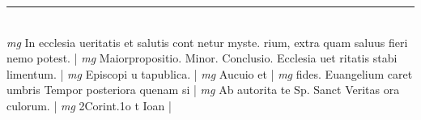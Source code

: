 \documentclass{article}
\begin{document}
\begin{pages}
\vspace{0.5cm}\noindent
\vspace{0.2cm}\rule{1cm}{0.2pt}\\ 
\hspace{0.2cm}\textit{mg}
\footnotesize In ecclesia ueritatis et salutis cont netur myste. rium, extra quam saluus fieri nemo potest. 
\normalsize| 
\hspace{0.2cm}\textit{mg}
\footnotesize Maiorpropositio. Minor. Conclusio. Ecclesia uet ritatis stabi limentum. 
\normalsize| 
\hspace{0.2cm}\textit{mg}
\footnotesize Episcopi u tapublica. 
\normalsize| 
\hspace{0.2cm}\textit{mg}
\footnotesize Aucuio et 
\normalsize| 
\hspace{0.2cm}\textit{mg}
\footnotesize fides. Euangelium caret umbris Tempor posteriora quenam si 
\normalsize| 
\hspace{0.2cm}\textit{mg}
\footnotesize Ab autorita te Sp. Sanct Veritas ora culorum. 
\normalsize| 
\hspace{0.2cm}\textit{mg}
\footnotesize 2Corint.1o t Ioan 
\normalsize| 

\end{pages}
\end{document}
